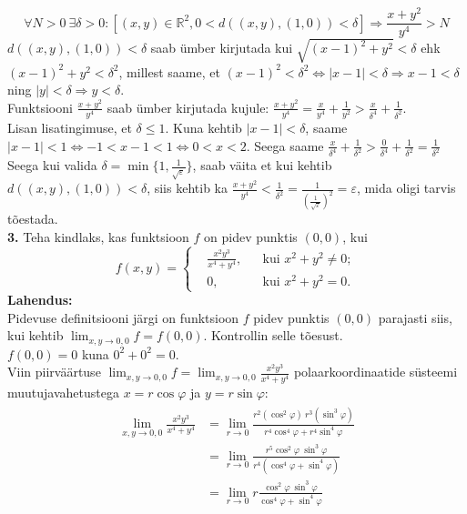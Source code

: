 \documentclass{article}
\begin{document}
\begin{equation*}
\forall N>0\ \exists\delta>0:[(x,y)\in\mathbb{R}^2,0<d((x,y),(1,0))<\delta]\Rightarrow\frac{x+y^2}{y^4}>N
\end{equation*}
$d((x,y),(1,0))<\delta$ saab ümber kirjutada kui $\sqrt{(x-1)^2+y^2}<\delta$ ehk $(x-1)^2+y^2<\delta^2$, millest saame, et $(x-1)^2<\delta^2\Leftrightarrow |x-1|<\delta\Rightarrow x-1<\delta$ ning $|y|<\delta\Rightarrow y<\delta$.\\
Funktsiooni $\frac{x+y^2}{y^4}$ saab ümber kirjutada kujule: $\frac{x+y^2}{y^4}=\frac{x}{y^4}+\frac{1}{y^2}>\frac{x}{\delta^4}+\frac{1}{\delta^2}$.\\
Lisan lisatingimuse, et $\delta\leq1$. Kuna kehtib $|x-1|<\delta$, saame $|x-1|<1\Leftrightarrow -1<x-1<1\Leftrightarrow 0<x<2$. Seega saame $\frac{x}{\delta^4}+\frac{1}{\delta^2}>\frac{0}{\delta^4}+\frac{1}{\delta^2}=\frac{1}{\delta^2}$\\
Seega kui valida $\delta=\min\{1,\frac{1}{\sqrt{\varepsilon}}\}$, saab väita et kui kehtib $d((x,y),(1,0))<\delta$, siis kehtib ka $\frac{x+y^2}{y^4}<\frac{1}{\delta^2}=\frac{1}{(\frac{1}{\sqrt{\varepsilon}})^2}=\varepsilon$, mida oligi tarvis tõestada.
\pagebreak\\
\textbf{3.} Teha kindlaks, kas funktsioon $f$ on pidev punktis $(0,0)$, kui
\begin{equation*}
f(x,y)=
\left\{
\begin{aligned}
&\frac{x^2y^3}{x^4+y^4}, && \text{kui } x^2+y^2\neq0;\\
&0, && \text{kui } x^2+y^2=0.
\end{aligned}
\right.
\end{equation*}
\textbf{Lahendus:}\\
Pidevuse definitsiooni järgi on funktsioon $f$ pidev punktis $(0,0)$ parajasti siis, kui kehtib $\lim_{x,y\to 0,0}f=f(0,0)$. Kontrollin selle tõesust.\\
$f(0,0)=0$ kuna $0^2+0^2=0$.\\
Viin piirväärtuse $\lim_{x,y\to 0,0}f=\lim_{x,y\to 0,0}\frac{x^2y^3}{x^4+y^4}$ polaarkoordinaatide süsteemi muutujavahetustega $x=r\cos \varphi$ ja $y=r\sin\varphi$:
\begin{gather*}
\begin{aligned}
\lim_{x,y\to 0,0}\frac{x^2y^3}{x^4+y^4}&=\lim_{r\to 0}\frac{r^2(\cos^2\varphi)\ r^3(\sin^3\varphi)}{r^4\cos^4\varphi+r^4\sin^4\varphi}\\
&=\lim_{r\to 0}\frac{r^5\cos^2\varphi\ \sin^3\varphi}{r^4(\cos^4\varphi+\sin^4\varphi)}\\
&=\lim_{r\to 0}r\frac{\cos^2\varphi\ \sin^3\varphi}{\cos^4\varphi+\sin^4\varphi}
\end{aligned}
\end{gather*}
\end{document}
